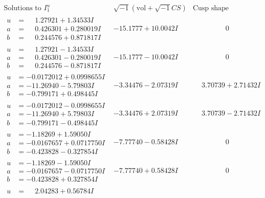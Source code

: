 \documentclass[1p]{elsarticle_modified}
\theoremstyle{definition}
\newcommand{\I}{\sqrt{-1}}
\begin{document}
$$\begin{array}{c|c|c}
\text{Solutions to }I^u_{1}& \I (\text{vol} + \sqrt{-1}CS) & \text{Cusp shape}\\
 \hline 
\begin{aligned}
u &= \phantom{-}1.27921 + 1.34533 I \\
a &= \phantom{-}0.426301 + 0.280019 I \\
b &= \phantom{-}0.244576 + 0.871817 I\end{aligned}
 & -15.1777 + 10.0042 I & \phantom{-0.000000 } 0 \\ \hline\begin{aligned}
u &= \phantom{-}1.27921 - 1.34533 I \\
a &= \phantom{-}0.426301 - 0.280019 I \\
b &= \phantom{-}0.244576 - 0.871817 I\end{aligned}
 & -15.1777 - 10.0042 I & \phantom{-0.000000 } 0 \\ \hline\begin{aligned}
u &= -0.0172012 + 0.0998655 I \\
a &= -11.26940 - 5.79803 I \\
b &= -0.799171 + 0.498445 I\end{aligned}
 & -3.34476 - 2.07319 I & \phantom{-}3.70739 + 2.71432 I \\ \hline\begin{aligned}
u &= -0.0172012 - 0.0998655 I \\
a &= -11.26940 + 5.79803 I \\
b &= -0.799171 - 0.498445 I\end{aligned}
 & -3.34476 + 2.07319 I & \phantom{-}3.70739 - 2.71432 I \\ \hline\begin{aligned}
u &= -1.18269 + 1.59050 I \\
a &= -0.0167657 + 0.0717750 I \\
b &= -0.423828 - 0.327854 I\end{aligned}
 & -7.77740 - 0.58428 I & \phantom{-0.000000 } 0 \\ \hline\begin{aligned}
u &= -1.18269 - 1.59050 I \\
a &= -0.0167657 - 0.0717750 I \\
b &= -0.423828 + 0.327854 I\end{aligned}
 & -7.77740 + 0.58428 I & \phantom{-0.000000 } 0 \\ \hline\begin{aligned}
u &= \phantom{-}2.04283 + 0.56784 I \\

\end{aligned}
\end{array}$$
\end{document}

